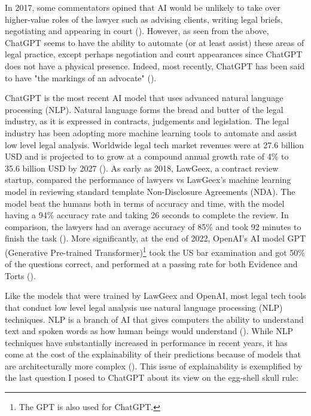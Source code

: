 In 2017, some commentators opined that AI would be unlikely to take over higher-value roles of the lawyer such as advising clients, writing legal briefs, negotiating and appearing in court (\cite{legaltech_nytimes}). However, as seen from the above, ChatGPT seems to have the ability to automate (or at least assist) these areas of legal practice, except perhaps negotiation and court appearances since ChatGPT does not have a physical presence. Indeed, most recently, ChatGPT has been said to have "the markings of an advocate" (\cite{legaltech_reuters}).

ChatGPT is the most recent AI model that uses advanced natural language processing (NLP). Natural language forms the bread and butter of the legal industry, as it is expressed in contracts, judgements and legislation. The legal industry has been adopting more machine learning tools to automate and assist low level legal analysis. Worldwide legal tech market revenues were at 27.6 billion USD and is projected to to grow at a compound annual growth rate of 4\% to 35.6 billion USD by 2027 (\cite{statista}). As early as 2018, LawGeex, a contract review startup, compared the performance of lawyers vs LawGeex's machine learning model in reviewing standard template Non-Disclosure Agreements (NDA). The model beat the humans both in terms of accuracy and time, with the model having a 94\% accuracy rate and taking 26 seconds to complete the review. In comparison, the lawyers had an average accuracy of 85\% and took 92 minutes to finish the task (\cite{lawgeex}). More significantly, at the end of 2022, OpenAI's AI model GPT (Generative Pre-trained Transformer)\footnote{The GPT is also used for ChatGPT.} took the US bar examination and got 50\% of the questions correct, and performed at a passing rate for both Evidence and Torts (\cite{bommarito2022}).

Like the models that were trained by LawGeex and OpenAI, most legal tech tools that conduct low level legal analysis use natural language processing (NLP) techniques. NLP is a branch of AI that gives computers the ability to understand text and spoken words as how human beings would understand (\cite{ibm_nlp}). While NLP techniques have substantially increased in performance in recent years, it has come at the cost of the explainability of their predictions because of models that are architecturally more complex (\cite{zini2022}). This issue of explainability is exemplified by the last question I posed to ChatGPT about its view on the egg-shell skull rule:

